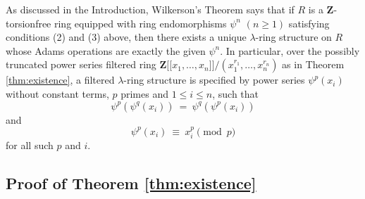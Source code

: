 \documentclass[reqno,11pt]{amsart}
\numberwithin{equation}{subsection}  %
\newcommand{\bZ}{\mathbf{Z}}
\begin{document}
As discussed in the Introduction, Wilkerson's Theorem \cite{wil} says that if $R$ is a $\mathbf{Z}$-torsionfree ring equipped with ring endomorphisms $\psi^n$ $(n \geq 1)$ satisfying conditions (2) and (3) above, then there exists a unique $\lambda$-ring structure on $R$ whose Adams operations are exactly the given $\psi^n$.  In particular, over the possibly truncated power series filtered ring $\bZ \lbrack \lbrack x_1, \ldots, x_n \rbrack \rbrack/(x_1^{r_1}, \ldots, x_n^{r_n})$ as in Theorem \ref{thm:existence}, a filtered $\lambda$-ring structure is specified by power series $\psi^p(x_i)$ without constant terms, $p$ primes and $1 \leq i \leq n$, such that
   \begin{equation}
   \label{eq:adams1}
   \psi^p(\psi^q(x_i)) ~=~ \psi^q(\psi^p(x_i))
   \end{equation}
and
   \begin{equation}
   \label{eq:adams2}
   \psi^p(x_i) ~\equiv~ x_i^p \pmod{p}
   \end{equation}
 for all such $p$ and $i$.



\subsection{Proof of Theorem \ref{thm:existence}}
\label{subsec:existence}
\end{document}
